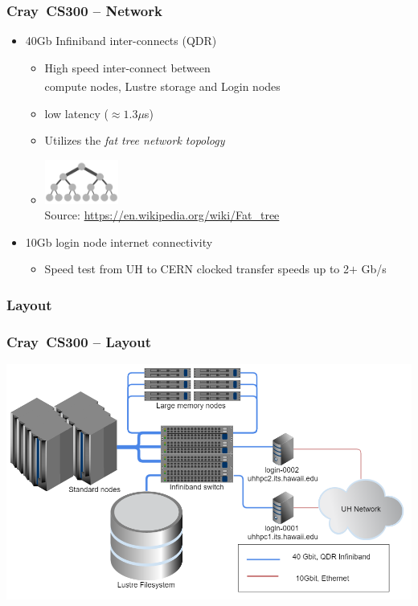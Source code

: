 \documentclass[t,hyperref={pdfpagelabels=false}]{beamer}
\newcommand{\regtrademark}{\fontsize{5}{6}\selectfont \textsuperscript{\textregistered}}
\newcommand{\lustre}{Lustre{\regtrademark}}
\newcommand{\craycs}{Cray~CS300}
\begin{document}
\begin{frame}
	\frametitle{{\craycs} -- Network}
	\begin{itemize}
		\item 40Gb Infiniband inter-connects (QDR)
		\begin{itemize}
			\item High speed inter-connect between~\\compute nodes, {\lustre} storage and Login nodes
                        \item low latency ($\approx1.3\mu$s)
			\item Utilizes the \emph{fat tree network topology}
			\item[] \includegraphics[width=0.20\textwidth]{images/Fat_tree_network} \\[-1ex] {\fontsize{3}{4} \selectfont Source: \url{https://en.wikipedia.org/wiki/Fat_tree} } 		
		\end{itemize}
		\item 10Gb login node internet connectivity
		\begin{itemize}
			\item Speed test from UH to CERN clocked transfer speeds up to 2$+$ Gb/s
		\end{itemize}	
	\end{itemize}
\end{frame}

\subsubsection{Layout}
\begin{frame}
	\frametitle{{\craycs} -- Layout}
	\includegraphics[width=1\textwidth]{images/layout}
\end{frame}
\end{document}
